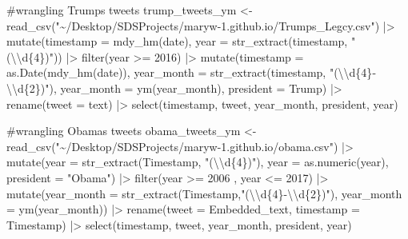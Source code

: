\documentclass[
  letterpaper,
  DIV=11,
  numbers=noendperiod]{scrartcl}
\newenvironment{Shaded}{\begin{snugshade}}{\end{snugshade}}
\newcommand{\AttributeTok}[1]{\textcolor[rgb]{0.40,0.45,0.13}{#1}}
\newcommand{\CommentTok}[1]{\textcolor[rgb]{0.37,0.37,0.37}{#1}}
\newcommand{\DecValTok}[1]{\textcolor[rgb]{0.68,0.00,0.00}{#1}}
\newcommand{\FunctionTok}[1]{\textcolor[rgb]{0.28,0.35,0.67}{#1}}
\newcommand{\NormalTok}[1]{\textcolor[rgb]{0.00,0.23,0.31}{#1}}
\newcommand{\OtherTok}[1]{\textcolor[rgb]{0.00,0.23,0.31}{#1}}
\newcommand{\SpecialCharTok}[1]{\textcolor[rgb]{0.37,0.37,0.37}{#1}}
\newcommand{\StringTok}[1]{\textcolor[rgb]{0.13,0.47,0.30}{#1}}
\begin{document}
\begin{Shaded}
\begin{Highlighting}[]
\CommentTok{\#wrangling Trump\textquotesingle{}s tweets}
\NormalTok{trump\_tweets\_ym }\OtherTok{\textless{}{-}} \FunctionTok{read\_csv}\NormalTok{(}\StringTok{"\textasciitilde{}/Desktop/SDSProjects/maryw{-}1.github.io/Trumps\_Legcy.csv"}\NormalTok{) }\SpecialCharTok{|\textgreater{}}
  \FunctionTok{mutate}\NormalTok{(}\AttributeTok{timestamp =} \FunctionTok{mdy\_hm}\NormalTok{(date),}
         \AttributeTok{year =} \FunctionTok{str\_extract}\NormalTok{(timestamp, }\StringTok{"(}\SpecialCharTok{\textbackslash{}\textbackslash{}}\StringTok{d\{4\})"}\NormalTok{)) }\SpecialCharTok{|\textgreater{}}
  \FunctionTok{filter}\NormalTok{(year }\SpecialCharTok{\textgreater{}=} \DecValTok{2016}\NormalTok{) }\SpecialCharTok{|\textgreater{}}
  \FunctionTok{mutate}\NormalTok{(}\AttributeTok{timestamp =} \FunctionTok{as.Date}\NormalTok{(}\FunctionTok{mdy\_hm}\NormalTok{(date)),}
         \AttributeTok{year\_month =} \FunctionTok{str\_extract}\NormalTok{(timestamp, }\StringTok{"(}\SpecialCharTok{\textbackslash{}\textbackslash{}}\StringTok{d\{4\}{-}}\SpecialCharTok{\textbackslash{}\textbackslash{}}\StringTok{d\{2\})"}\NormalTok{), }
         \AttributeTok{year\_month =} \FunctionTok{ym}\NormalTok{(year\_month), }
         \AttributeTok{president =} \StringTok{\textquotesingle{}Trump\textquotesingle{}}\NormalTok{) }\SpecialCharTok{|\textgreater{}}
  \FunctionTok{rename}\NormalTok{(}\AttributeTok{tweet =}\NormalTok{ text) }\SpecialCharTok{|\textgreater{}} 
  \FunctionTok{select}\NormalTok{(timestamp, tweet, year\_month, president, year) }
  
\CommentTok{\#wrangling Obama\textquotesingle{}s tweets }
\NormalTok{obama\_tweets\_ym }\OtherTok{\textless{}{-}} \FunctionTok{read\_csv}\NormalTok{(}\StringTok{"\textasciitilde{}/Desktop/SDSProjects/maryw{-}1.github.io/obama.csv"}\NormalTok{) }\SpecialCharTok{|\textgreater{}}
    \FunctionTok{mutate}\NormalTok{(}\AttributeTok{year =} \FunctionTok{str\_extract}\NormalTok{(Timestamp, }\StringTok{"(}\SpecialCharTok{\textbackslash{}\textbackslash{}}\StringTok{d\{4\})"}\NormalTok{),}
           \AttributeTok{year =} \FunctionTok{as.numeric}\NormalTok{(year),}
           \AttributeTok{president =} \StringTok{"Obama"}\NormalTok{) }\SpecialCharTok{|\textgreater{}} 
  \FunctionTok{filter}\NormalTok{(year }\SpecialCharTok{\textgreater{}=} \DecValTok{2006}\NormalTok{ , year }\SpecialCharTok{\textless{}=} \DecValTok{2017}\NormalTok{) }\SpecialCharTok{|\textgreater{}}
  \FunctionTok{mutate}\NormalTok{(}\AttributeTok{year\_month =} \FunctionTok{str\_extract}\NormalTok{(Timestamp,}\StringTok{"(}\SpecialCharTok{\textbackslash{}\textbackslash{}}\StringTok{d\{4\}{-}}\SpecialCharTok{\textbackslash{}\textbackslash{}}\StringTok{d\{2\})"}\NormalTok{),}
         \AttributeTok{year\_month =} \FunctionTok{ym}\NormalTok{(year\_month)) }\SpecialCharTok{|\textgreater{}} 
  \FunctionTok{rename}\NormalTok{(}\AttributeTok{tweet =}\NormalTok{ Embedded\_text,}
         \AttributeTok{timestamp =}\NormalTok{ Timestamp) }\SpecialCharTok{|\textgreater{}}
  \FunctionTok{select}\NormalTok{(timestamp, tweet, year\_month, president, year) }


\end{Highlighting}
\end{Shaded}
\end{document}
